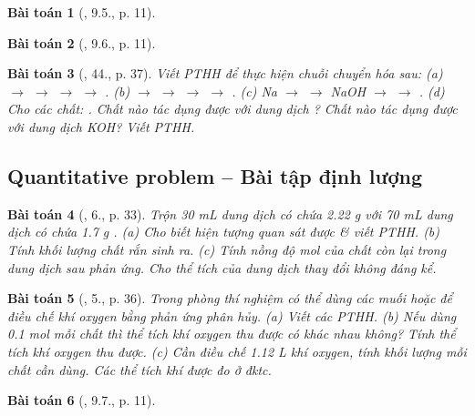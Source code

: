 \documentclass{article}
\newtheorem{baitoan}{Bài toán}
\begin{document}
\begin{baitoan}[\cite{SBT_Hoa_Hoc_9}, 9.5., p. 11]
	
\end{baitoan}

\begin{baitoan}[\cite{SBT_Hoa_Hoc_9}, 9.6., p. 11]
	
\end{baitoan}

\begin{baitoan}[\cite{An_350_BT_Hoa_Hoc_9}, 44., p. 37]
	Viết PTHH để thực hiện chuỗi chuyển hóa sau: (a) \emph{ $\to$  $\to$  $\to$  $\to$ }. (b) \emph{ $\to$  $\to$  $\to$  $\to$ }. (c) \emph{Na $\to$  $\to$ NaOH $\to$  $\to$ }. (d) Cho các chất: \emph{}. Chất nào tác dụng được với dung dịch \emph{}? Chất nào tác dụng được với dung dịch \emph{KOH}? Viết PTHH.
\end{baitoan}

\subsection{Quantitative problem -- Bài tập định lượng}

\begin{baitoan}[\cite{SGK_Hoa_Hoc_9}, 6., p. 33]
	Trộn \emph{30 mL} dung dịch có chứa \emph{2.22 g } với \emph{70 mL} dung dịch có chứa \emph{1.7 g }. (a) Cho biết hiện tượng quan sát được \& viết PTHH. (b) Tính khối lượng chất rắn sinh ra. (c) Tính nồng độ mol của chất còn lại trong dung dịch sau phản ứng. Cho thể tích của dung dịch thay đổi không đáng kể.
\end{baitoan}

\begin{baitoan}[\cite{SGK_Hoa_Hoc_9}, 5., p. 36]
	Trong phòng thí nghiệm có thể dùng các muối \emph{} hoặc \emph{} để điều chế khí oxygen bằng phản ứng phân hủy. (a) Viết các PTHH. (b) Nếu dùng \emph{0.1 mol} mỗi chất thì thể tích khí oxygen thu được có khác nhau không? Tính thể tích khí oxygen thu được. (c) Cần điều chế \emph{1.12 L} khí oxygen, tính khối lượng mỗi chất cần dùng. Các thể tích khí được đo ở đktc.
\end{baitoan}

\begin{baitoan}[\cite{SBT_Hoa_Hoc_9}, 9.7., p. 11]
	
\end{baitoan}
\end{document}
